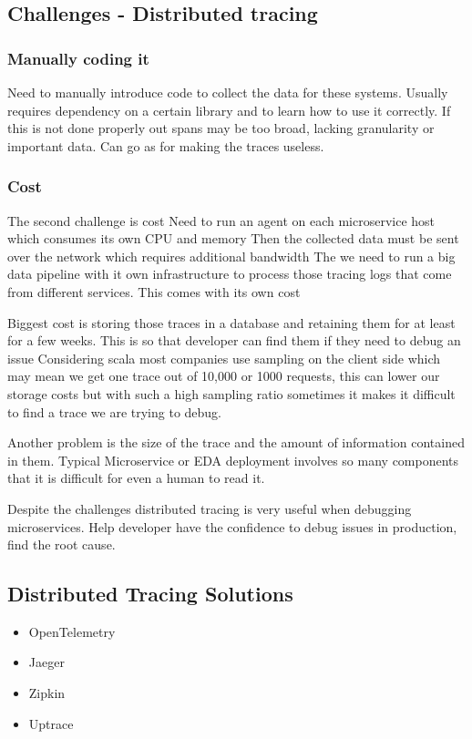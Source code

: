 \subsection{Challenges - Distributed tracing}

\subsubsection{Manually coding it}
Need to manually introduce code to collect the data for these systems.
Usually requires dependency on a certain library and to learn how to use it correctly.
If this is not done properly out spans may be too broad, lacking granularity or important data.
Can go as for making the traces useless.

\subsubsection{Cost}
The second challenge is cost
Need to run an agent on each microservice host which consumes its own CPU and memory
Then the collected data must be sent over the network which requires additional bandwidth
The we need to run a big data pipeline with it own infrastructure to process those tracing logs that come from different services.
This comes with its own cost

Biggest cost is storing those traces in a database and retaining them for at least for a few weeks.
This is so that developer can find them if they need to debug an issue
Considering scala most companies use sampling on the client side which may mean we get one trace out of 10,000 or 1000 requests,
this can lower our storage costs but with such a high sampling ratio sometimes it makes it difficult to find a trace we are trying to debug.

Another problem is the size of the trace and the amount of information contained in them.
Typical Microservice or EDA deployment involves so many components that it is difficult for even a human to read it.

Despite the challenges distributed tracing is very useful when debugging microservices.
Help developer have the confidence to debug issues in production, find the root cause.


\subsection{Distributed Tracing Solutions}
\begin{itemize}
    \item OpenTelemetry
    \item Jaeger
    \item Zipkin
    \item Uptrace
\end{itemize}